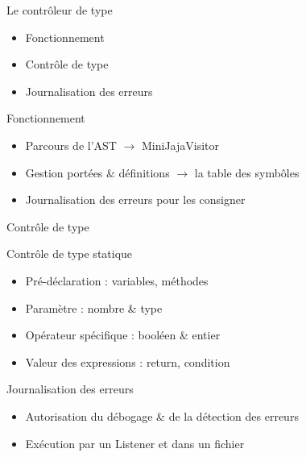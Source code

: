 \begin{chapter}{}{Le contrôleur de type}
    \begin{itemize}
          \item Fonctionnement
          \item Contrôle de type
          \item Journalisation des erreurs
    \end{itemize}
\end{chapter}

\begin{frame}{Fonctionnement}
    \begin{block}{}
        \begin{itemize}
            \item Parcours de l'AST $\rightarrow$ MiniJajaVisitor
            \item Gestion portées \& définitions $\rightarrow$ la table des symbôles
            \item Journalisation des erreurs pour les consigner
        \end{itemize}
    \end{block}
\end{frame}

\begin{frame}{Contrôle de type}
    \begin{block}{Contrôle de type statique}
        \begin{itemize}
            \item Pré-déclaration : variables, méthodes
            \item Paramètre : nombre \& type
            \item Opérateur spécifique : booléen \& entier
            \item Valeur des expressions : return, condition
        \end{itemize}
    \end{block}

\end{frame}
\begin{frame}{Journalisation des erreurs}
    \begin{block}{}
        \begin{itemize}
            \item Autorisation du débogage \& de la détection des erreurs
            \item Exécution par un Listener et dans un fichier
        \end{itemize}
    \end{block}
\end{frame}
